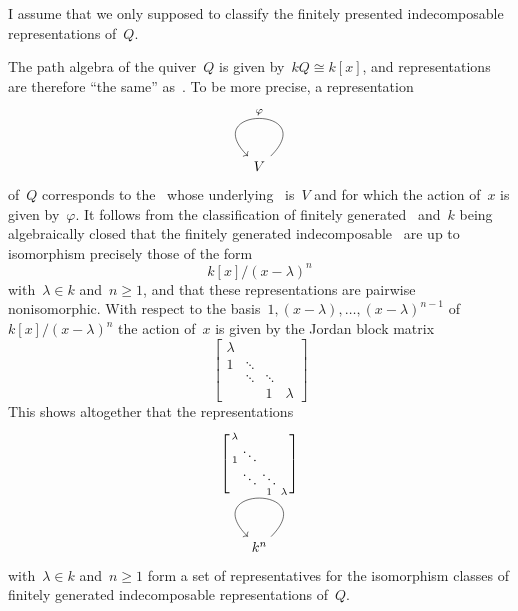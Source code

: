 \section{}





\subsection{}

I assume that we only supposed to classify the finitely presented indecomposable representations of~$Q$.

The path algebra of the quiver~$Q$ is given by~$k Q \cong k[x]$, and representations are therefore \enquote{the same} as~{}.
To be more precise, a representation
\[
  \begin{tikzcd}
    V
    \arrow[loop]{r}[above]{\varphi}
  \end{tikzcd}
\]
of~$Q$ corresponds to the~{} whose underlying~{\kvs} is~$V$ and for which the action of~$x$ is given by~$\varphi$.
It follows from the classification of finitely generated~{} and~$k$ being algebraically closed that the finitely generated indecomposable~{} are up to isomorphism precisely those of the form
\[
  k[x]/(x-\lambda)^n
\]
with~$\lambda \in k$ and~$n \geq 1$, and that these representations are pairwise nonisomorphic.
With respect to the basis~$1, (x-\lambda), \dotsc, (x-\lambda)^{n-1}$ of~$k[x]/(x-\lambda)^n$ the action of~$x$ is given by the Jordan block matrix
\[
  \begin{bmatrix}
      \lambda
    & {}
    & {}
    & {}
    \\
      1
    & \ddots
    & {}
    & {}
    \\
      {}
    & \ddots
    & \ddots
    & {}
    \\
      {}
    & {}
    & 1
    & \lambda
  \end{bmatrix}
\]
This shows altogether that the representations
\[
  \begin{tikzcd}[ampersand replacement = \&]
    k^n
    \arrow[loop]{r}[above]{
      \begin{bsmallmatrix}
          \lambda
        & {}
        & {}
        & {}
        \\
          1
        & \ddots
        & {}
        & {}
        \\
          {}
        & \ddots
        & \ddots
        & {}
        \\
          {}
        & {}
        & 1
        & \lambda
      \end{bsmallmatrix}
    }
  \end{tikzcd}
\]
with~$\lambda \in k$ and~$n \geq 1$ form a set of representatives for the isomorphism classes of finitely generated indecomposable representations of~$Q$.





